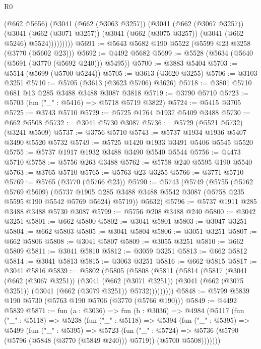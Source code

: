 \begin{lexlean}{R0}
\begin{coremodule}
            (@662 @5656)
            (@3041
              (@662 (@3063 @3257))
              (@3041
                (@662 (@3067 @3257))
                (@3041
                  (@662 (@3071 @3257))
                  (@3041 (@662 (@3075 @3257)) (@3041 (@662 @5246) @5524)))))))))
@5691 := @5643 @5682 @190 @5522 (@5599 @23 @3258 (@3770 (@5602 @23)))
@5692 := @4492 @5682
@5699 := @5528 (@5634 (@5640 (@5691 (@3770 (@5692 @240))) @5495))
@5700 := @3883 @5404
@5703 := @5514 (@5699 (@5700 @5244))
@5705 := @3613 (@3620 @3255)
@5706 := @3103 @3251
@5710 := @5705 (@3613 (@3623 @5706) @3626)
@5718 := @3801 @5710 @681 @13 @285 @3488 @3488 @3087 @3818
@5719 := @3790 @5710
@5723 := @5703 (fun ("_" : @5416) => @5718 @5719 @3822)
@5724 := @5415 @3705
@5725 := @3743 @5710
@5729 := @5725 @1764 @1937 @5409 @3488
@5730 := @662 @5508
@5732 := @3041 @5730 @3087
@5736 := @5729 (@5521 @5732) (@3241 @5509)
@5737 := @3756 @5710
@5743 := @5737 @1934 @1936 @5407 @3490 @5520 @5732
@5749 := @5725 @1420 @1933 @3491 @5406 @5545 @5520
@5755 := @5737 @1917 @1932 @3488 @3490 @5540 @5544
@5756 := @4473 @5710
@5758 := @5756 @263 @3488
@5762 := @5758 @240 @5595 @190 @5540
@5763 := @3765 @5710
@5765 := @5763 @23 @3255
@5766 := @3771 @5710
@5769 := @5765 (@3770 (@5766 @23))
@5790 := @5743
    (@5749
      (@5755
        (@5762 @5769 @5609)
        (@5737 @1905 @285 @3488 @3488 @5542 @3087 (@5758 @235 @5595 @190 @5542 @5769 @5624) @5719))
      @5632)
@5796 := @5737 @1911 @285 @3488 @3488 @5730 @3087
@5799 := @5756 @208 @3488 @240
@5800 := @3042 @3251
@5801 := @662 @5800
@5802 := @3041 @5801
@5803 := @3047 @3251
@5804 := @662 @5803
@5805 := @3041 @5804
@5806 := @3051 @3251
@5807 := @662 @5806
@5808 := @3041 @5807
@5809 := @3055 @3251
@5810 := @662 @5809
@5811 := @3041 @5810
@5812 := @3059 @3251
@5813 := @662 @5812
@5814 := @3041 @5813
@5815 := @3063 @3251
@5816 := @662 @5815
@5817 := @3041 @5816
@5839 := @5802
    (@5805
      (@5808
        (@5811
          (@5814
            (@5817
              (@3041
                (@662 (@3067 @3251))
                (@3041
                  (@662 (@3071 @3251))
                  (@3041 (@662 (@3075 @3251)) (@3041 (@662 (@3079 @3251)) @5732)))))))))
@5848 := @5799 @5839 @190 @5730 (@5763 @190 @5706 (@3770 (@5766 @190)))
@5849 := @4492 @5839
@5871 := fun (a : @3036) =>
  fun (b : @3036) =>
  @4984
    (@5117
      (fun ("_" : @5118) =>
      @5238
        (fun ("_" : @5118) =>
        @5394
          (fun ("_" : @5395) =>
          @5499
            (fun ("_" : @5395) =>
            @5723
              (fun ("_" : @5724) =>
              @5736 (@5790 (@5796 (@5848 (@3770 (@5849 @240))) @5719)) (@5700 @5508)))))))

\end{coremodule}
\end{lexlean}
